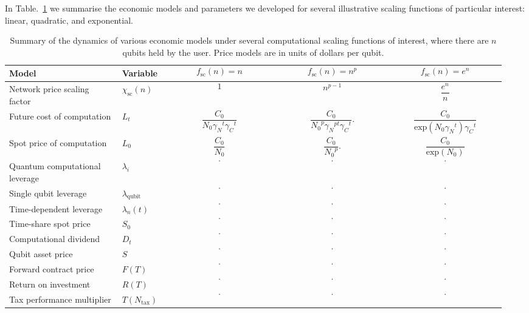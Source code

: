 \documentclass[aps, rmp, twocolumn, amsmath, amssymb, nofootinbib, superscriptaddress, longbibliography, floatfix, table-of-contents, eqsecnum]{revtex4-1}
\newcommand{\comment}[1]{{\color{blue}{\textbf{#1}}}}
\begin{document}
In Table.~\ref{tab:summary_ec_models} we summarise the economic models and parameters we developed for several illustrative scaling functions of particular interest: linear, quadratic, and exponential.

\begin{table}[!htb]
\caption{Summary of the dynamics of various economic models under several computational scaling functions of interest, where there are $n$ qubits held by the user. Price models are in units of dollars per qubit. \comment{Fix all these!}} \label{tab:summary_ec_models}
\begin{tabular}{|p{0.22\linewidth}|p{0.07\linewidth}|p{0.22\linewidth}|p{0.22\linewidth}|p{0.22\linewidth}|}
	\hline
	Model & Variable & \[f_\text{sc}(n)=n\] & \[f_\text{sc}(n)=n^p\] & \[f_\text{sc}(n)=e^n\]\\
	\hline \hline
	Network price scaling factor & $\chi_\text{sc}(n)$ & \[1\] & \[n^{p-1}\] & \[\frac{e^n}{n}\]\\
	\hline
	Future cost of computation & $L_t$ & \[\frac{C_0}{N_0{\gamma_N}^{t}{\gamma_C}^{t}}\] & \[\frac{C_0}{{N_0}^p{\gamma_N}^{pt}{\gamma_C}^t}.\] & \[\frac{C_0}{\text{exp}(N_0{\gamma_N}^t){\gamma_C}^t}\]\\
	\hline
	Spot price of computation & $L_0$ & \[\frac{C_0}{N_0}\] & \[\frac{C_0}{{N_0}^p}.\] & \[\frac{C_0}{\text{exp}(N_0)}\]\\
	\hline
	Quantum computational leverage & $\lambda_i$ & \[.\] & \[.\] & \[.\]\\
	\hline
	Single qubit leverage & $\lambda_\text{qubit}$ & \[.\] & \[.\] & \[.\]\\
	\hline
	Time-dependent leverage & $\lambda_n(t)$ &  \[.\] & \[.\] & \[.\]\\
	\hline
	Time-share spot price & $S_0$ & \[.\] & \[.\] & \[.\]\\
	\hline
	Computational dividend & $D_t$ & \[.\] & \[.\] & \[.\]\\
	\hline
	Qubit asset price & $S$ & \[.\] & \[.\] & \[.\]\\
	\hline
	Forward contract price & $F(T)$ & \[.\] & \[.\] & \[.\]\\
	\hline
	Return on investment & $R(T)$ & \[.\] & \[.\] & \[.\]\\
	\hline
	Tax performance multiplier & $T(N_\text{tax})$ & \[.\] & \[.\] & \[.\]\\
	\hline
\end{tabular}
\end{table}

%
%
\end{document}
